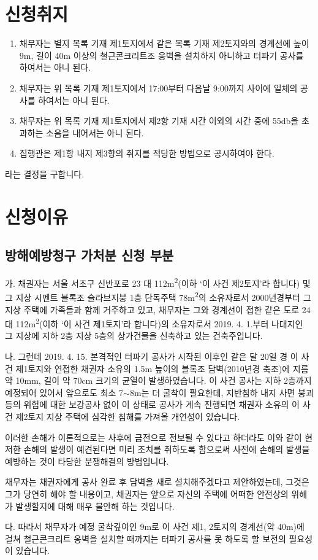 \documentclass[12pt]{oblivoir}
\begin{document}
\chapter*{\large 신청취지}
\begin{enumerate}[nosep, left=0pt] %
\item 채무자는 별지 목록 기재 제1토지에서 같은 목록 기재 제2토지와의 경계선에 높이 9m, 길이 40m 이상의 철근콘크리트조 옹벽을 설치하지 아니하고 터파기 공사를 하여서는 아니 된다.
\item 채무자는 위 목록 기재 제1토지에서 17:00부터 다음날 9:00까지 사이에 일체의 공사를 하여서는 아니 된다.
\item 채무자는 위 목록 기재 제1토지에서 제2항 기재 시간 이외의 시간 중에 55\si{\decibel}을 초과하는 소음을 내어서는 아니 된다.
\item 집행관은 제1항 내지 제3항의 취지를 적당한 방법으로 공시하여야 한다.
\end{enumerate}
라는 결정을 구합니다.
\vspace{5em}
\chapter*{신청이유}
\section{방해예방청구 가처분 신청 부분}
가. 채권자는 서울 서초구 신반포로 23 대 112\si{\square\metre}(이하 `이 사건 제2토지'라 합니다) 및 그 지상 시멘트 블록조 슬라브지붕 1층 단독주택 78\si{\square\metre}의 소유자로서 2000년경부터 그 지상 주택에 가족들과 함께 거주하고 있고, 채무자는 그와 경계선이 접한 같은 도로 24 대 112\si{\square\metre}(이하 `이 사건 제1토지'라 합니다)의 소유자로서 2019. 4. 1.부터 나대지인 그 지상에 지하 2층 지상 5층의 상가건물을 신축하고 있는 건축주입니다.\par
나. 그런데 2019. 4. 15. 본격적인 터파기 공사가 시작된 이후인 같은 달 20일 경 이 사건 제1토지와 연접한 채권자 소유의 1.5\si{\metre} 높이의 블록조 담벽(2010년경 축조)에 지름 약 10\si{\milli\metre}, 길이 약 70\si{\centi\metre} 크기의 균열이 발생하였습니다. 이 사건 공사는 지하 2층까지 예정되어 있어서 앞으로도 최소 7$\sim$8\si{\metre}는 더 굴착이 필요한데, 지반침하 내지 사면 붕괴 등의 위험에 대한 보강공사 없이 이 상태로 공사가 계속 진행되면 채권자 소유의 이 사건 제2토지 지상 주택에 심각한 침해를 가져올 개연성이 있습니다.\par
이러한 손해가 이론적으로는 사후에 금전으로 전보될 수 있다고 하더라도 이와 같이 현저한 손해의 발생이 예견된다면 미리 조치를 취하도록 함으로써 사전에 손해의 발생을 예방하는 것이 타당한 분쟁해결의 방법입니다.\par
채무자는 채권자에게 공사 완료 후 담벽을 새로 설치해주겠다고 제안하였는데, 그것은 그가 당연히 해야 할 내용이고, 채권자는 앞으로 자신의 주택에 어떠한 안전상의 위해가 발생할지에 대해 매우 불안해 하는 것입니다.\par
다. 따라서 채무자가 예정 굴착깊이인 9\si{\metre}로 이 사건 제1, 2토지의 경계선(약 40\si{\metre})에 걸쳐 철근콘크리트 옹벽을 설치할 때까지는 터파기 공사를 못 하도록 할 보전의 필요성이 있습니다.
\end{document}
